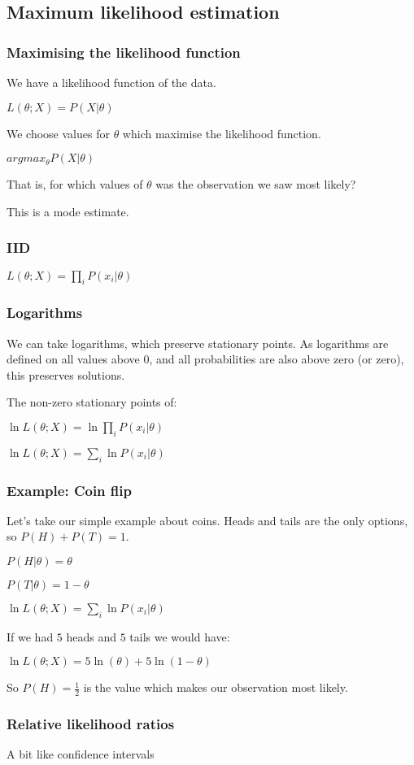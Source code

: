 
\subsection{Maximum likelihood estimation}

\subsubsection{Maximising the likelihood function}

We have a likelihood function of the data.

\(L(\theta ; X)=P(X|\theta )\)

We choose values for \(\theta \) which maximise the likelihood function.

\(argmax_\theta P(X|\theta )\)

That is, for which values  of \(\theta \) was the observation we saw most likely?

This is a mode estimate.

\subsubsection{IID}

\(L(\theta ; X)=\prod_i P(x_i|\theta )\)

\subsubsection{Logarithms}

We can take logarithms, which preserve stationary points. As logarithms are defined on all values above \(0\), and all probabilities are also above zero (or zero), this preserves solutions.

The non-zero stationary points of:

\(\ln L(\theta ; X)=\ln \prod_i P(x_i|\theta )\)

\(\ln L(\theta ; X)=\sum_i \ln P(x_i|\theta )\)

\subsubsection{Example: Coin flip}

Let’s take our simple example about coins. Heads and tails are the only options, so \(P(H)+P(T)=1\). 

\(P(H|\theta )=\theta \)

\(P(T|\theta )=1-\theta \)

\(\ln L(\theta ; X)=\sum_i \ln P(x_i|\theta )\)

If we had \(5\) heads and \(5\) tails we would have:

\(\ln L(\theta ; X)=5\ln (\theta )+ 5\ln (1-\theta )\)

So \(P(H)=\frac{1}{2}\) is the value which makes our observation most likely.

\subsubsection{Relative likelihood ratios}

A bit like confidence intervals
	

